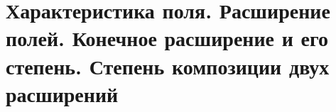 \section{Характеристика поля. Расширение полей. Конечное расширение и его степень. Степень композиции двух расширений}